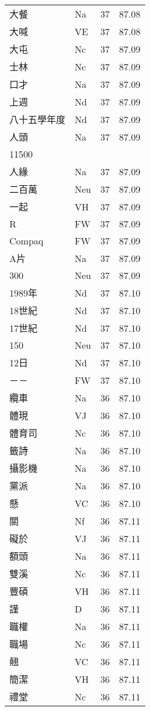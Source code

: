 \documentclass[twocolumn]{book}
\begin{document}
\begin{supertabular}{llrr}
大餐 & Na & 37 &  87.08\\
大喊 & VE & 37 &  87.08\\
大屯 & Nc & 37 &  87.09\\
士林 & Nc & 37 &  87.09\\
口才 & Na & 37 &  87.09\\
上週 & Nd & 37 &  87.09\\
八十五學年度 & Nd & 37 &  87.09\\
人頭 & Na & 37 &  87.09\\
11500\\
人緣 & Na & 37 &  87.09\\
二百萬 & Neu & 37 &  87.09\\
一起 & VH & 37 &  87.09\\
R & FW & 37 &  87.09\\
Compaq & FW & 37 &  87.09\\
A片 & Na & 37 &  87.09\\
300 & Neu & 37 &  87.09\\
1989年 & Nd & 37 &  87.10\\
18世紀 & Nd & 37 &  87.10\\
17世紀 & Nd & 37 &  87.10\\
150 & Neu & 37 &  87.10\\
12日 & Nd & 37 &  87.10\\
－－ & FW & 37 &  87.10\\
纜車 & Na & 36 &  87.10\\
體現 & VJ & 36 &  87.10\\
體育司 & Nc & 36 &  87.10\\
籤詩 & Na & 36 &  87.10\\
攝影機 & Na & 36 &  87.10\\
黨派 & Na & 36 &  87.10\\
懸 & VC & 36 &  87.10\\
關 & Nf & 36 &  87.11\\
礙於 & VJ & 36 &  87.11\\
額頭 & Na & 36 &  87.11\\
雙溪 & Nc & 36 &  87.11\\
豐碩 & VH & 36 &  87.11\\
謹 & D & 36 &  87.11\\
職權 & Na & 36 &  87.11\\
職場 & Nc & 36 &  87.11\\
翹 & VC & 36 &  87.11\\
簡潔 & VH & 36 &  87.11\\
禮堂 & Nc & 36 &  87.11\\

\end{supertabular}
\end{document}
